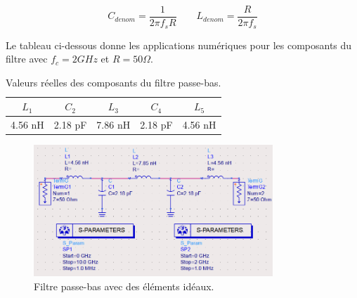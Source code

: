 \documentclass[french]{article}
\begin{document}
\begin{equation}
	C_{denom} = \frac{1}{2\pi f_s R}
	\qquad
	L_{denom} = \frac{R}{2\pi f_s}
\end{equation}

Le tableau ci-dessous donne les applications numériques pour les composants du filtre avec $f_c = 2GHz$ et $R = 50\Omega$.

\begin{table}[H]
	\centering
	\begin{tabular}{|c|c|c|c|c|}
		\hline
		$L_1$ & $C_2$ & $L_3$ & $C_4$ & $L_5$\\
		\hline
		4.56 nH & 2.18 pF & 7.86 nH & 2.18 pF & 4.56 nH\\
		\hline
	\end{tabular}
	\caption{Valeurs réelles des composants du filtre passe-bas.}
	\label{tab:valeurs_composant_passe_bas}
\end{table}


\begin{figure}[H]
	\centering
	\includegraphics[width=9cm]{photo/passe_bas_vic/schema_localise_passe_bas_ads.png}
	\caption{Filtre passe-bas avec des éléments idéaux.}
	\label{fig:schema_localise_passe_bas_ads}
\end{figure}
\end{document}
